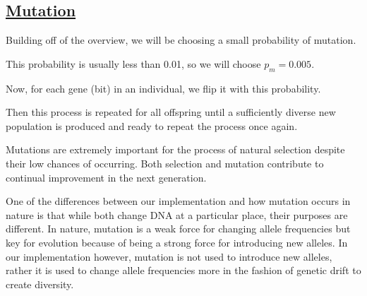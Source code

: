 \newpage
\subsection{\underline{Mutation}}

Building off of the overview, we will be choosing a small probability of 
mutation.
\bi
\item This probability is usually less than 0.01, so we will choose
$p_m = 0.005$.
\item Now, for each gene (bit) in an individual, we flip it with this probability. 
\item Then this process is repeated for all offspring until a sufficiently diverse new population is produced and ready to repeat the process once again.
\item Mutations are extremely important for the process of natural selection despite their low chances of occurring. Both selection and mutation contribute to continual improvement in the next generation.
\item One of the differences between our implementation and how mutation 
occurs in nature is that while both change DNA at a particular place, their
purposes are different. In nature, mutation is a weak force for changing 
allele frequencies but key for evolution because of being a strong force
for introducing new alleles. In our implementation however, mutation is not
used to introduce new alleles, rather it is used to change allele frequencies
more in the fashion of genetic drift to create diversity.
\ei